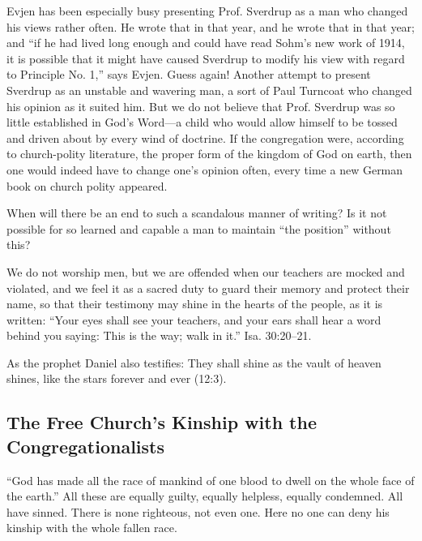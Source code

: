 Evjen has been especially busy presenting Prof. Sverdrup as a man who changed his views rather often. He wrote that in that year, and he wrote that in that year; and “if he had lived long enough and could have read Sohm’s new work of 1914, it is possible that it might have caused Sverdrup to modify his view with regard to Principle No. 1,” says Evjen. Guess again! Another attempt to present Sverdrup as an unstable and wavering man, a sort of Paul Turncoat who changed his opinion as it suited him. But we do not believe that Prof. Sverdrup was so little established in God’s Word—a child who would allow himself to be tossed and driven about by every wind of doctrine. If the congregation were, according to church-polity literature, the proper form of the kingdom of God on earth, then one would indeed have to change one’s opinion often, every time a new German book on church polity appeared.

When will there be an end to such a scandalous manner of writing? Is it not possible for so learned and capable a man to maintain “the position” without this?

We do not worship men, but we are offended when our teachers are mocked and violated, and we feel it as a sacred duty to guard their memory and protect their name, so that their testimony may shine in the hearts of the people, as it is written: “Your eyes shall see your teachers, and your ears shall hear a word behind you saying: This is the way; walk in it.” Isa. 30:20–21.

As the prophet Daniel also testifies: They shall shine as the vault of heaven shines, like the stars forever and ever (12:3).

\subsection{The Free Church's Kinship with the Congregationalists}

“God has made all the race of mankind of one blood to dwell on the whole face of the earth.” All these are equally guilty, equally helpless, equally condemned. All have sinned. There is none righteous, not even one. Here no one can deny his kinship with the whole fallen race.


